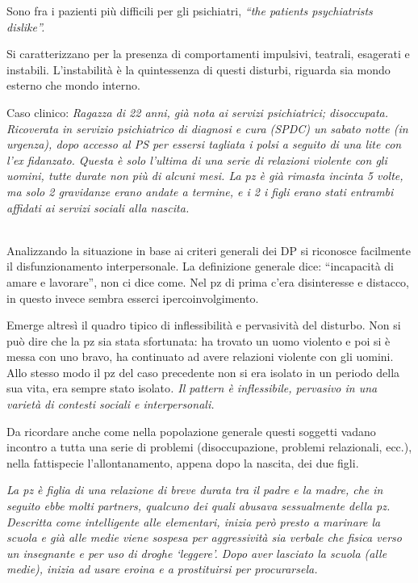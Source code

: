 Sono fra i pazienti più difficili per gli psichiatri, \emph{``the
patients psychiatrists dislike''.}

Si caratterizzano per la presenza di comportamenti impulsivi, teatrali,
esagerati e instabili. L'instabilità è la quintessenza di questi
disturbi, riguarda sia mondo esterno che mondo interno.

Caso clinico: \emph{Ragazza di 22 anni, già nota ai servizi
psichiatrici; disoccupata. Ricoverata in servizio psichiatrico di
diagnosi e cura (SPDC) un sabato notte (in urgenza), dopo accesso al PS
per essersi tagliata i polsi a seguito di una lite con l'ex fidanzato.
Questa è solo l'ultima di una serie di relazioni violente con gli
uomini, tutte durate non più di alcuni mesi. La pz è già rimasta incinta
5 volte, ma solo 2 gravidanze erano andate a termine, e i 2 i figli
erano stati entrambi affidati ai servizi sociali alla nascita.}

\emph{\\
}Analizzando la situazione in base ai criteri generali dei DP si
riconosce facilmente il disfunzionamento interpersonale. La definizione
generale dice: ``incapacità di amare e lavorare'', non ci dice come. Nel
pz di prima c'era disinteresse e distacco, in questo invece sembra
esserci ipercoinvolgimento.

Emerge altresì il quadro tipico di inflessibilità e pervasività del
disturbo. Non si può dire che la pz sia stata sfortunata: ha trovato un
uomo violento e poi si è messa con uno bravo, ha continuato ad avere
relazioni violente con gli uomini. Allo stesso modo il pz del caso
precedente non si era isolato in un periodo della sua vita, era sempre
stato isolato\emph{. Il pattern è inflessibile, pervasivo in una varietà
di contesti sociali e interpersonali.}

Da ricordare anche come nella popolazione generale questi soggetti
vadano incontro a tutta una serie di problemi (disoccupazione, problemi
relazionali, ecc.), nella fattispecie l'allontanamento, appena dopo la
nascita, dei due figli.

\emph{La pz è figlia di una relazione di breve durata tra il padre e la
madre, che in seguito ebbe molti partners, qualcuno dei quali abusava
sessualmente della pz. Descritta come intelligente alle elementari,
inizia però presto a marinare la scuola e già alle medie viene sospesa
per aggressività sia verbale che fisica verso un insegnante e per uso di
droghe `leggere'. Dopo aver lasciato la scuola (alle medie), inizia ad
usare eroina e a prostituirsi per procurarsela. }

